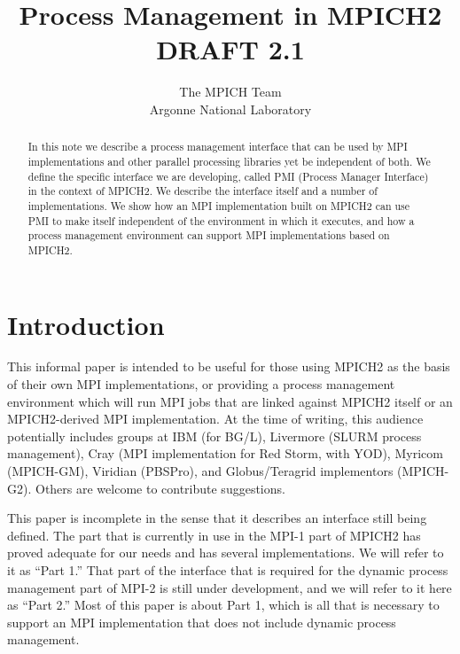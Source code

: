 \documentclass[11pt]{article}
\begin{document}
\title{{\bf Process Management in MPICH2}\\[.2in] DRAFT 2.1}
\author{The MPICH Team\\Argonne National Laboratory}
\maketitle

\begin{abstract}
  In this note we describe a process management interface that can be
  used by MPI implementations and other parallel processing libraries
  yet be independent of both.  We define the specific interface we are
  developing, called PMI (Process Manager Interface) in the context of
  MPICH2.  We describe the interface itself and a number of
  implementations.  We show how an MPI implementation built on MPICH2
  can use PMI to make itself independent of the environment in which it
  executes, and how a process management environment can support MPI
  implementations based on MPICH2.
\end{abstract}

\section{Introduction}
\label{sec:introduction}

This informal paper is intended to be useful for those using MPICH2 as the
basis of their own MPI implementations, or providing a process
management environment which will run MPI jobs that are linked against
MPICH2 itself or an MPICH2-derived MPI implementation.  At the time of
writing, this audience potentially includes groups at IBM (for BG/L), Livermore
(SLURM process management), Cray (MPI implementation for Red Storm, with
YOD), Myricom (MPICH-GM), Viridian (PBSPro), and Globus/Teragrid
implementors (MPICH-G2).  Others are welcome to contribute suggestions.

This paper is incomplete in the sense that it describes an interface
still being defined.  The part that is currently in use in the MPI-1
part of MPICH2 has proved adequate for our needs and has several
implementations.  We will refer to it as ``Part 1.''  That part of the
interface that is required for the dynamic process management part of
MPI-2 is still under development, and we will refer to it here as ``Part
2.''  Most of this paper is about Part 1, which is all that is necessary
to support an MPI implementation that does not include dynamic process
management.
\end{document}
